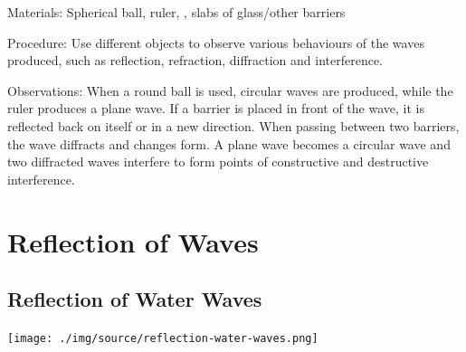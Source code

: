 \begin{multicols}{2}
\begin{description*}
\item[Materials:]{Spherical ball, ruler, , slabs of glass/other barriers}
\item[Procedure:]{Use different objects to observe various behaviours of the waves produced, such as reflection, refraction, diffraction and interference.}
\item[Observations:]{When a round ball is used, circular waves are produced, while the ruler produces a plane wave. If a barrier is placed in front of the wave, it is reflected back on itself or in a new direction. When passing between two barriers, the wave diffracts and changes form. A plane wave becomes a circular wave and two diffracted waves interfere to form points of constructive and destructive interference.}
\end{description*}


\section*{Reflection of Waves}


\subsection{Reflection of Water Waves}

\begin{center}
\texttt{[image: ./img/source/reflection-water-waves.png]}
\end{center}


\end{multicols}
